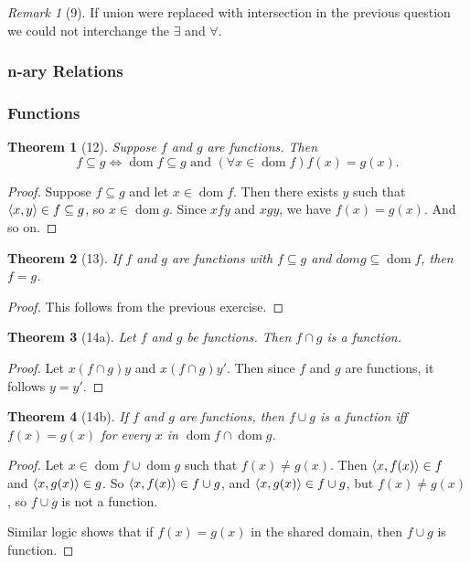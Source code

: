 \documentclass[12pt]{article}
\theoremstyle{plain}
\newtheorem*{exthm}{Theorem}
\theoremstyle{remark}
\theoremstyle{definition}
\theoremstyle{remark}
\newtheorem*{remark}{Remark}
\DeclarePairedDelimiter{\ang}{\langle}{\rangle}
\renewcommand{\iff}{\Leftrightarrow}
\DeclareMathOperator{\dom}{dom}
\begin{document}
\begin{remark}[9]
  If union were replaced with intersection in the previous question we could not interchange the $\exists$ and $\forall$.
\end{remark}

\subsubsection{n-ary Relations}
\subsubsection{Functions}

\begin{exthm}[12]
  Suppose $f$ and $g$ are functions. Then
  \[
    f \subseteq g \iff \dom{f} \subseteq g \text{ and  } (\forall x \in \dom{f}) f(x) = g(x).
  \]
\end{exthm}
\begin{proof}
  Suppose $f \subseteq g$ and let $x \in \dom{f}$. Then there exists $y$ such that $\ang{x, y} \in f \subseteq g$, so $x \in \dom{g}$. Since $xfy$ and $xgy$, we have $f(x) = g(x)$. And so on.
\end{proof}

\begin{exthm}[13]
  If $f$ and $g$ are functions with $f \subseteq g$ and $dom g \subseteq \dom{f}$, then $f = g$.
\end{exthm}
\begin{proof}
  This follows from the previous exercise.
\end{proof}

\begin{exthm}[14a]
  Let $f$ and $g$ be functions. Then $f \cap g$ is a function.
\end{exthm}
\begin{proof}
  Let $x(f\cap g)y$ and $x(f \cap g)y'$. Then since $f$ and $g$ are functions, it follows $y = y'$.
\end{proof}

\begin{exthm}[14b]
  If $f$ and $g$ are functions, then $f \cup g$ is a function iff $f(x) = g(x)$ for every $x$ in $\dom{f} \cap \dom{g}$.
\end{exthm}
\begin{proof}
  Let $x \in \dom{f} \cup \dom{g}$ such that $f(x) \neq g(x)$. Then $\ang{x, f(x)} \in f$ and $\ang{x, g(x)} \in g$. So $\ang{x, f(x)} \in f \cup g$, and $\ang{x, g(x)} \in f \cup g$, but $f(x) \neq g(x)$, so $f \cup g$ is not a function.

  Similar logic shows that if $f(x) = g(x)$ in the shared domain, then $f \cup g$ is function.
\end{proof}
\end{document}
